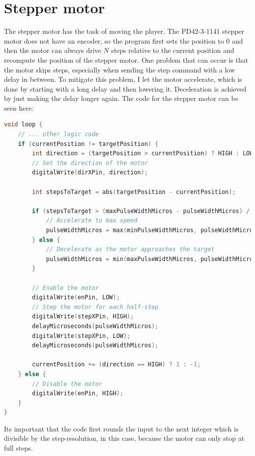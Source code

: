 \section{Stepper motor}\label{sec:stepper-motor}
The stepper motor has the task of moving the player.
The PD42-3-1141 stepper motor does not have an encoder, so the program first sets the position to $0$ and then the motor can always drive $N$ steps relative to the current position and recompute the position of the stepper motor.
One problem that can occur is that the motor skips steps, especially when sending the step command with a low delay in between.
To mitigate this problem, I let the motor accelerate, which is done by starting with a long delay and then lowering it.
Deceleration is achieved by just making the delay longer again.
The code for the stepper motor can be seen here:
\begin{lstlisting}[language=cpp,breaklines,label={lst:stepper-motor}]
void loop {
    // ... other logic code
    if (currentPosition != targetPosition) {
        int direction = (targetPosition > currentPosition) ? HIGH : LOW;
        // Set the direction of the motor
        digitalWrite(dirXPin, direction);

        int stepsToTarget = abs(targetPosition - currentPosition);

        if (stepsToTarget > (maxPulseWidthMicros - pulseWidthMicros) / acc) {
            // Accelerate to max speed
            pulseWidthMicros = max(minPulseWidthMicros, pulseWidthMicros - acc);
        } else {
            // Decelerate as the motor approaches the target
            pulseWidthMicros = min(maxPulseWidthMicros, pulseWidthMicros + acc);
        }

        // Enable the motor
        digitalWrite(enPin, LOW);
        // Step the motor for each half-step
        digitalWrite(stepXPin, HIGH);
        delayMicroseconds(pulseWidthMicros);
        digitalWrite(stepXPin, LOW);
        delayMicroseconds(pulseWidthMicros);

        currentPosition += (direction == HIGH) ? 1 : -1;
    } else {
        // Disable the motor
        digitalWrite(enPin, HIGH);
    }
}
\end{lstlisting}
Its important that the code first rounds the input to the next integer which is divisible by the step-resolution, in this case, because the motor can only stop at full steps.\\
\vspace{0.5cm}\\

